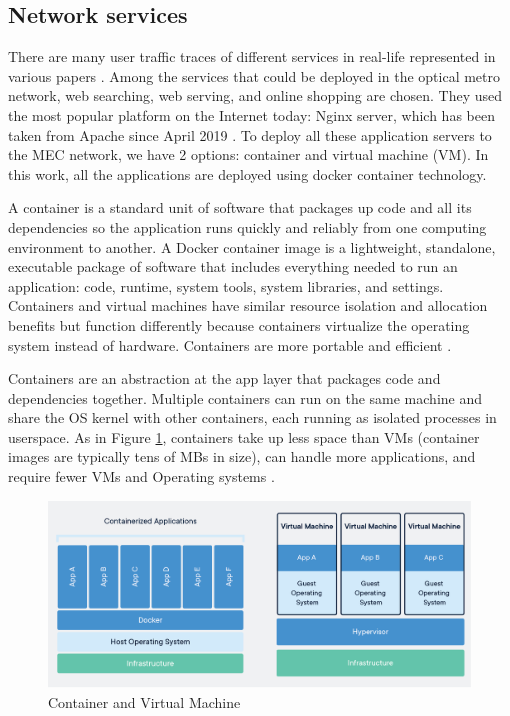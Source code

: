 \documentclass[conference]{IEEEtran}
\begin{document}
\subsection{Network services}
There are many user traffic traces of different services in real-life represented in various papers \cite{International2017, 7469991, Shi2016}. Among the services that could be deployed in the optical metro network, web searching, web serving, and online shopping are chosen. They used the most popular platform on the Internet today: Nginx server, which has been taken from Apache since April 2019 \cite{netcraft_news_2021}. To deploy all these application servers to the MEC network, we have 2 options: container and virtual machine (VM). In this work, all the applications are deployed using docker container technology. 

A container is a standard unit of software that packages up code and all its dependencies so the application runs quickly and reliably from one computing environment to another. A Docker container image is a lightweight, standalone, executable package of software that includes everything needed to run an application: code, runtime, system tools, system libraries, and settings. Containers and virtual machines have similar resource isolation and allocation benefits but function differently because containers virtualize the operating system instead of hardware. Containers are more portable and efficient \cite{7036275}.

Containers are an abstraction at the app layer that packages code and dependencies together. Multiple containers can run on the same machine and share the OS kernel with other containers, each running as isolated processes in userspace. As in Figure \ref{fig:container_img}, containers take up less space than VMs (container images are typically tens of MBs in size), can handle more applications, and require fewer VMs and Operating systems \cite{docker}.

\begin{figure}[]
    \centering
    \includegraphics[scale = 0.25]{imgs/container-VM.png}
    \caption{Container and Virtual Machine}
    \label{fig:container_img}
\end{figure}
\end{document}

